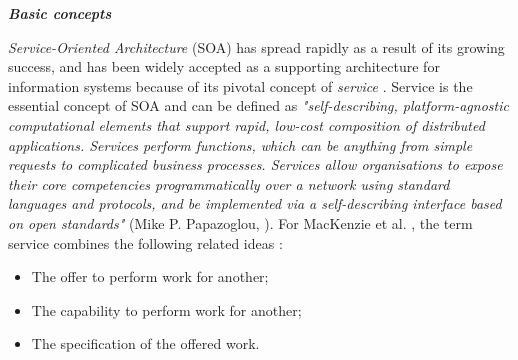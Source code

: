 \label{chap1:sec:soa-concept}
\noindent\textbf{\textit{Basic concepts}} 

\textit{Service-Oriented Architecture} (SOA) has spread rapidly as a result of its growing success, and has been widely accepted as a supporting architecture for information systems because of its pivotal concept of \textit{service} \cite{boukhedouma2015adaptation}. Service is the essential concept of SOA and can be defined as \textit{"self-describing, platform-agnostic computational elements that support rapid, low-cost composition of distributed applications. Services perform functions, which can be anything from simple requests to complicated business  processes. Services allow organisations to expose their core competencies programmatically over a network using standard languages and protocols, and be implemented via a self-describing interface based on open standards"} (Mike P. Papazoglou, \citeyearpar{papazoglou2003service}). For MacKenzie et al. \citeyearpar{mackenzie2006reference}, the term service combines the following related ideas :
\begin{itemize}
	\item The offer to perform work for another;
	\item The capability to perform work for another;
	\item The specification of the offered work.
\end{itemize}

